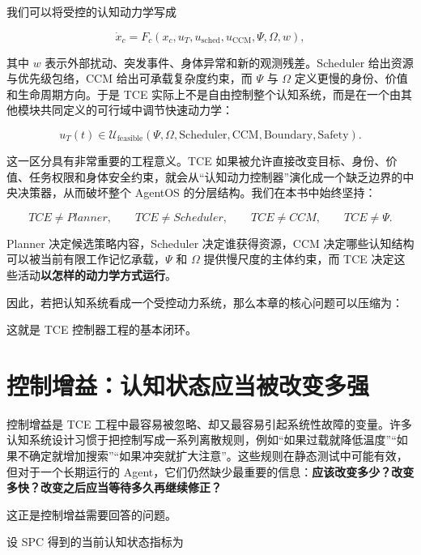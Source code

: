 我们可以将受控的认知动力学写成

\[
\dot x_c
=
F_c
\left(
x_c,
u_T,
u_{\mathrm{sched}},
u_{\mathrm{CCM}},
\Psi,
\Omega,
w
\right),
\]

其中 $w$ 表示外部扰动、突发事件、身体异常和新的观测残差。Scheduler 给出资源与优先级包络，CCM 给出可承载复杂度约束，而 $\Psi$ 与 $\Omega$ 定义更慢的身份、价值和生命周期方向。于是 TCE 实际上不是自由控制整个认知系统，而是在一个由其他模块共同定义的可行域中调节快速动力学：

\[
u_T(t)
\in
\mathcal U_{\mathrm{feasible}}
\left(
\Psi,
\Omega,
\mathrm{Scheduler},
\mathrm{CCM},
\mathrm{Boundary},
\mathrm{Safety}
\right).
\]

这一区分具有非常重要的工程意义。TCE 如果被允许直接改变目标、身份、价值、任务权限和身体安全约束，就会从“认知动力控制器”演化成一个缺乏边界的中央决策器，从而破坏整个 AgentOS 的分层结构。我们在本书中始终坚持：

\[
\boxed{
TCE\neq Planner,\qquad
TCE\neq Scheduler,\qquad
TCE\neq CCM,\qquad
TCE\neq \Psi.
}
\]

Planner 决定候选策略内容，Scheduler 决定谁获得资源，CCM 决定哪些认知结构可以被当前有限工作记忆承载，$\Psi$ 和 $\Omega$ 提供慢尺度的主体约束，而 TCE 决定这些活动\textbf{以怎样的动力学方式运行}。

因此，若把认知系统看成一个受控动力系统，那么本章的核心问题可以压缩为：

\begin{statementbox}
\centering
{}
\end{statementbox}

这就是 TCE 控制器工程的基本闭环。

\section{控制增益：认知状态应当被改变多强}

控制增益是 TCE 工程中最容易被忽略、却又最容易引起系统性故障的变量。许多认知系统设计习惯于把控制写成一系列离散规则，例如“如果过载就降低温度”“如果不确定就增加搜索”“如果冲突就扩大注意”。这些规则在静态测试中可能有效，但对于一个长期运行的 Agent，它们仍然缺少最重要的信息：\textbf{应该改变多少？改变多快？改变之后应当等待多久再继续修正？}

这正是控制增益需要回答的问题。

设 SPC 得到的当前认知状态指标为

